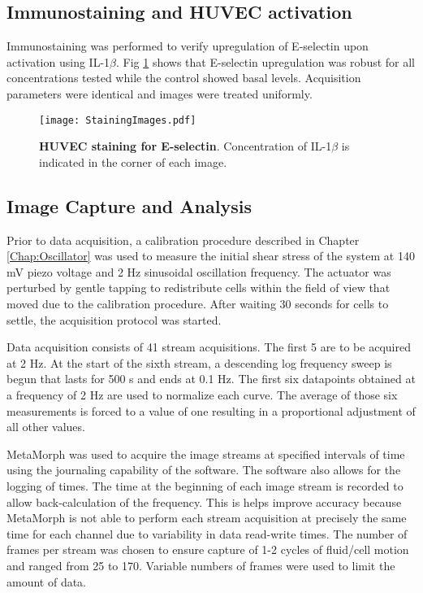 \subsection{Immunostaining and HUVEC activation}

Immunostaining was performed to verify upregulation of E-selectin upon activation using IL-1$\beta$. Fig \ref{Chap:TumorCellAdhesion:fig:staining} shows that E-selectin upregulation was robust for all concentrations tested while the control showed basal levels. Acquisition parameters were identical and images were treated uniformly.

\begin{figure}[!ht]
\centering
\texttt{[image: StainingImages.pdf]}
\caption{\textbf{HUVEC staining for E-selectin}. Concentration of IL-1$\beta$ is indicated in the corner of each image.}
\label{Chap:TumorCellAdhesion:fig:staining}
\end{figure}


\subsection{Image Capture and Analysis}

Prior to data acquisition, a calibration procedure described in Chapter \ref{Chap:Oscillator} was used to measure the initial shear stress of the system at 140 mV piezo voltage and 2 Hz sinusoidal oscillation frequency. The actuator was perturbed by gentle tapping to redistribute cells within the field of view that moved due to the calibration procedure. After waiting 30 seconds for cells to settle, the acquisition protocol was started.

Data acquisition consists of 41 stream acquisitions. The first 5 are to be acquired at 2 Hz. At the start of the sixth stream, a descending log frequency sweep is begun that lasts for 500 s and ends at 0.1 Hz. The first six datapoints obtained at a frequency of 2 Hz are used to normalize each curve. The average of those six measurements is forced to a value of one resulting in a proportional adjustment of all other values.

MetaMorph was used to acquire the image streams at specified intervals of time using the journaling capability of the software. The software also allows for the logging of times. The time at the beginning of each image stream is recorded to allow back-calculation of the frequency. This is helps improve accuracy because MetaMorph is not able to perform each stream acquisition at precisely the same time for each channel due to variability in data read-write times. The number of frames per stream was chosen to ensure capture of 1-2 cycles of fluid\slash cell motion and ranged from 25 to 170. Variable numbers of frames were used to limit the amount of data.

